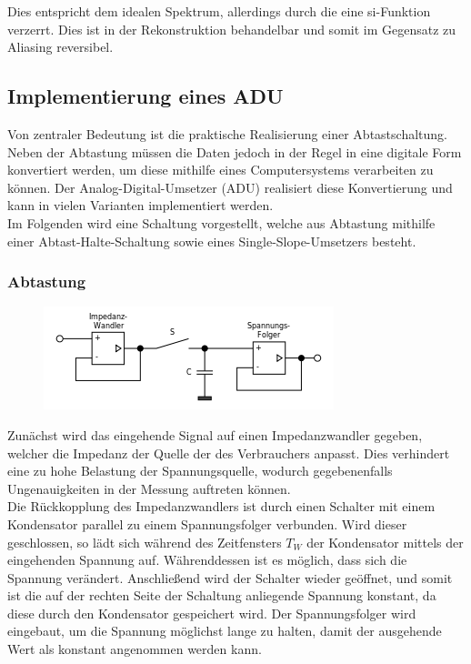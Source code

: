 Dies entspricht dem idealen Spektrum, allerdings durch die eine si-Funktion verzerrt. Dies ist in der Rekonstruktion behandelbar und somit im Gegensatz zu Aliasing reversibel.\\

\subsection{Implementierung eines ADU}
Von zentraler Bedeutung ist die praktische Realisierung einer Abtastschaltung. Neben der Abtastung müssen die Daten jedoch in der Regel in eine digitale Form konvertiert werden, um diese mithilfe eines Computersystems verarbeiten zu können. Der Analog-Digital-Umsetzer (ADU) realisiert diese Konvertierung und kann in vielen Varianten implementiert werden.\\
Im Folgenden wird eine Schaltung vorgestellt, welche aus Abtastung mithilfe einer Abtast-Halte-Schaltung sowie eines Single-Slope-Umsetzers besteht.
\subsubsection{Abtastung}
\label{3.3.1}

\begin{figure}[h!]
\centering
\includegraphics[scale=0.8]{images/abtastung_schaltung.png}
\label{sah_schaltung}
\end{figure}

Zunächst wird das eingehende Signal auf einen Impedanzwandler gegeben, welcher die Impedanz der Quelle der des Verbrauchers anpasst. Dies verhindert eine zu hohe Belastung der Spannungsquelle, wodurch gegebenenfalls Ungenauigkeiten in der Messung auftreten können.\\
Die Rückkopplung des Impedanzwandlers ist durch einen Schalter mit einem Kondensator parallel zu einem Spannungsfolger verbunden. Wird dieser geschlossen, so lädt sich während des Zeitfensters $T_W$ der Kondensator mittels der eingehenden Spannung auf. Währenddessen ist es möglich, dass sich die Spannung verändert. Anschließend wird der Schalter wieder geöffnet, und somit ist die auf der rechten Seite der Schaltung anliegende Spannung konstant, da diese durch den Kondensator gespeichert wird. Der Spannungsfolger wird eingebaut, um die Spannung möglichst lange zu halten, damit der ausgehende Wert als konstant angenommen werden kann.\\

